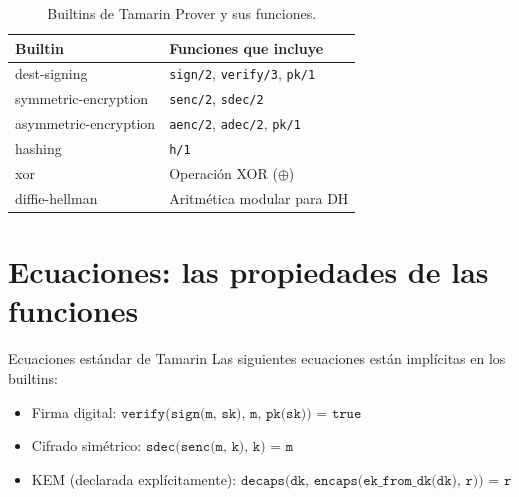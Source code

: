 \documentclass[12pt, a4paper, twoside, openright]{book}
\begin{document}
\begin{table}[H]
\centering
\caption{Builtins de Tamarin Prover y sus funciones.}
\label{tab:builtins}
\begin{tabular}{>{\ttfamily}p{5cm} p{8cm}}
\toprule
\normalfont Builtin & Funciones que incluye \\
\midrule
dest-signing & \texttt{sign/2}, \texttt{verify/3}, \texttt{pk/1} \\[3pt]
symmetric-encryption & \texttt{senc/2}, \texttt{sdec/2} \\[3pt]
asymmetric-encryption & \texttt{aenc/2}, \texttt{adec/2}, \texttt{pk/1} \\[3pt]
hashing & \texttt{h/1} \\[3pt]
xor & Operaci\'on XOR ($\oplus$) \\[3pt]
diffie-hellman & Aritm\'etica modular para DH \\
\bottomrule
\end{tabular}
\end{table}

\section{Ecuaciones: las propiedades de las funciones}

\begin{cajaEjemplo}{Ecuaciones est\'andar de Tamarin}
  Las siguientes ecuaciones est\'an impl\'icitas en los builtins:
  \begin{itemize}[itemsep=3pt]
    \item Firma digital:
      $\texttt{verify(sign(m, sk), m, pk(sk)) = true}$
    \item Cifrado sim\'etrico:
      $\texttt{sdec(senc(m, k), k) = m}$
    \item KEM (declarada expl\'icitamente):
      $\texttt{decaps(dk, encaps(ek\_from\_dk(dk), r)) = r}$
  \end{itemize}
\end{cajaEjemplo}
\end{document}
